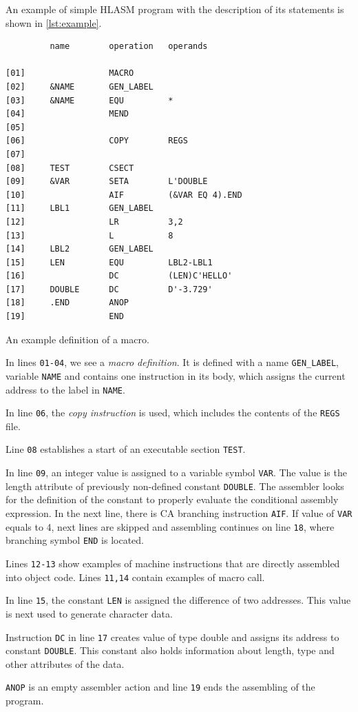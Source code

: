 An example of simple HLASM program with the description of its statements is shown in \cref{lst:example}.
\begin{listing}
\begin{verbatim}
         name        operation   operands
         
[01]                 MACRO                   
[02]     &NAME       GEN_LABEL
[03]     &NAME       EQU         *
[04]                 MEND
[05]             
[06]                 COPY        REGS
[07]             
[08]     TEST        CSECT
[09]     &VAR        SETA        L'DOUBLE
[10]                 AIF         (&VAR EQ 4).END
[11]     LBL1        GEN_LABEL
[12]                 LR          3,2
[13]                 L           8
[14]     LBL2        GEN_LABEL
[15]     LEN         EQU         LBL2-LBL1
[16]                 DC          (LEN)C'HELLO'
[17]     DOUBLE      DC          D'-3.729'
[18]     .END        ANOP
[19]                 END
\end{verbatim} 
\caption{An example definition of a macro.}
\label{lst:example}
\end{listing}

In lines \verb|01-04|, we see a \emph{macro definition}. It is defined with a name \verb|GEN_LABEL|, variable \verb|NAME| and contains one instruction in its body, which assigns the current address to the label in \verb|NAME|.

In line \verb|06|, the \emph{copy instruction} is used, which includes the contents of the \verb|REGS| file.

Line \verb|08| establishes a start of an executable section \verb|TEST|. 

In line \verb|09|, an integer value is assigned to a variable symbol \verb|VAR|. The value is the length attribute of previously non-defined constant \verb|DOUBLE|. The assembler looks for the definition of the constant to properly evaluate the conditional assembly expression. In the next line, there is CA branching instruction \verb|AIF|. If value of \verb|VAR| equals to 4, next lines are skipped and assembling continues on line \verb|18|, where branching symbol \verb|END| is located.  

Lines \verb|12-13| show examples of machine instructions that are directly assembled into object code. Lines \verb|11,14| contain examples of macro call.

In line \verb|15|, the constant \verb|LEN| is assigned the difference of two addresses. This value is next used to generate character data.

Instruction \verb|DC| in line \verb|17| creates value of type double and assigns its address to constant \verb|DOUBLE|. This constant also holds information about length, type and other attributes of the data.  

\verb|ANOP| is an empty assembler action and line \verb|19| ends the assembling of the program. 

\vspace{5mm}